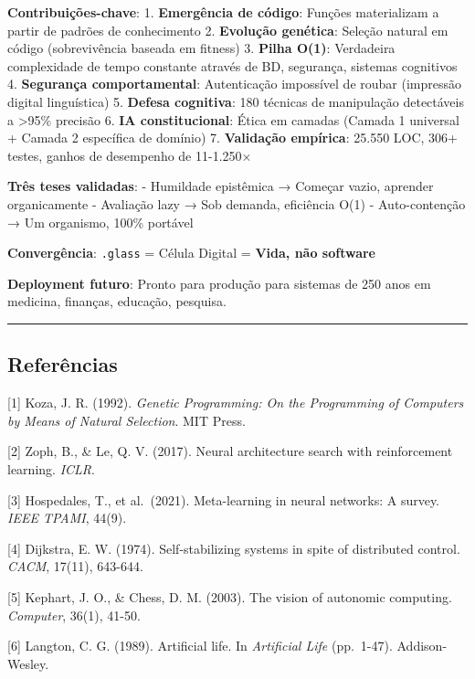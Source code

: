\documentclass[
]{article}
\begin{document}
\textbf{Contribuições-chave}: 1. \textbf{Emergência de código}: Funções
materializam a partir de padrões de conhecimento 2. \textbf{Evolução
genética}: Seleção natural em código (sobrevivência baseada em fitness)
3. \textbf{Pilha O(1)}: Verdadeira complexidade de tempo constante
através de BD, segurança, sistemas cognitivos 4. \textbf{Segurança
comportamental}: Autenticação impossível de roubar (impressão digital
linguística) 5. \textbf{Defesa cognitiva}: 180 técnicas de manipulação
detectáveis a \textgreater95\% precisão 6. \textbf{IA constitucional}:
Ética em camadas (Camada 1 universal + Camada 2 específica de domínio)
7. \textbf{Validação empírica}: 25.550 LOC, 306+ testes, ganhos de
desempenho de 11-1.250×

\textbf{Três teses validadas}: - Humildade epistêmica → Começar vazio,
aprender organicamente - Avaliação lazy → Sob demanda, eficiência O(1) -
Auto-contenção → Um organismo, 100\% portável

\textbf{Convergência}: \texttt{.glass} = Célula Digital = \textbf{Vida,
não software}

\textbf{Deployment futuro}: Pronto para produção para sistemas de 250
anos em medicina, finanças, educação, pesquisa.

\begin{center}\rule{0.5\linewidth}{0.5pt}\end{center}

\subsection{Referências}\label{referuxeancias}

{[}1{]} Koza, J. R. (1992). \emph{Genetic Programming: On the
Programming of Computers by Means of Natural Selection}. MIT Press.

{[}2{]} Zoph, B., \& Le, Q. V. (2017). Neural architecture search with
reinforcement learning. \emph{ICLR}.

{[}3{]} Hospedales, T., et al.~(2021). Meta-learning in neural networks:
A survey. \emph{IEEE TPAMI}, 44(9).

{[}4{]} Dijkstra, E. W. (1974). Self-stabilizing systems in spite of
distributed control. \emph{CACM}, 17(11), 643-644.

{[}5{]} Kephart, J. O., \& Chess, D. M. (2003). The vision of autonomic
computing. \emph{Computer}, 36(1), 41-50.

{[}6{]} Langton, C. G. (1989). Artificial life. In \emph{Artificial
Life} (pp.~1-47). Addison-Wesley.
\end{document}
